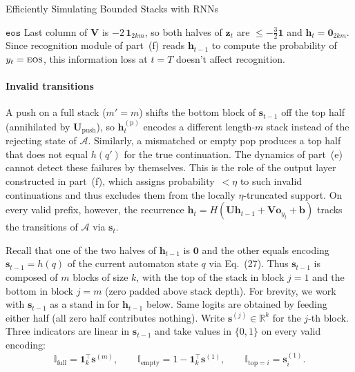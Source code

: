 \begin{question}{Efficiently Simulating Bounded Stacks with RNNs}
\begin{subquestion}
    
    \textbf{$\mathtt{eos}$} Last column of $\mathbf{V}$ is $-2\,\mathbf{1}_{2km}$, so both halves of $\mathbf{z}_t$ are $\le -\tfrac{3}{2}\mathbf{1}$ and $\mathbf{h}_t = \mathbf{0}_{2km}$. 
    Since recognition module of part~(f) reads $\mathbf{h}_{t-1}$ to compute the probability of $y_t = \eos$, this information loss at $t = T$ doesn't affect recognition.


    \paragraph{Invalid transitions} A push on a full stack ($m' = m$) shifts the bottom block of $\mathbf{s}_{t-1}$ off the top half (annihilated by $\mathbf{U}_{\text{push}}$), 
    so $\mathbf{h}_t^{(\text{p})}$ encodes a different length-$m$ stack instead of the rejecting state of $\mathcal{A}$. 
    Similarly, a mismatched or empty pop produces a top half that does not equal $h(q')$ for the true continuation. 
    The dynamics of part~(e) cannot detect these failures by themselves. 
    This is the role of the output layer constructed in part~(f), which assigns probability~$<\eta$ to such invalid continuations and
    thus excludes them from the locally $\eta$-truncated support. 
    On every valid prefix, however, the recurrence $\mathbf{h}_t = H(\mathbf{U}\mathbf{h}_{t-1} + \mathbf{V}\mathbf{o}_{y_t} + \mathbf{b})$ tracks the transitions of $\mathcal{A}$ via $\mathbf{s}_t$.
\end{subquestion}

\begin{subquestion}
    Recall that one of the two halves of $\mathbf{h}_{t-1}$ is $\mathbf{0}$ and the other equals encoding $\mathbf{s}_{t-1} = h(q)$ of the current automaton state $q$ via Eq.~(27). 
    Thus $\mathbf{s}_{t-1}$ is composed of $m$ blocks of size $k$, with the top of the stack in block $j = 1$ and the bottom in block $j = m$ (zero padded above stack depth). 
    For brevity, we work with $\mathbf{s}_{t-1}$ as a stand in for $\mathbf{h}_{t-1}$ below. 
    Same logits are obtained by feeding either half (all zero half contributes nothing). 
    Write $\mathbf{s}^{(j)} \in \mathbb{R}^{k}$ for the $j$-th block. 
    Three indicators are linear in $\mathbf{s}_{t-1}$ and take values in $\{0, 1\}$ on every valid encoding:
    \[
        \mathbb{I}_{\text{full}} = \mathbf{1}_k^\top \mathbf{s}^{(m)}, \qquad \mathbb{I}_{\text{empty}} = 1 - \mathbf{1}_k^\top \mathbf{s}^{(1)}, \qquad \mathbb{I}_{\text{top}=i} = \mathbf{s}^{(1)}_i.
    \]


\end{subquestion}
\end{question}

